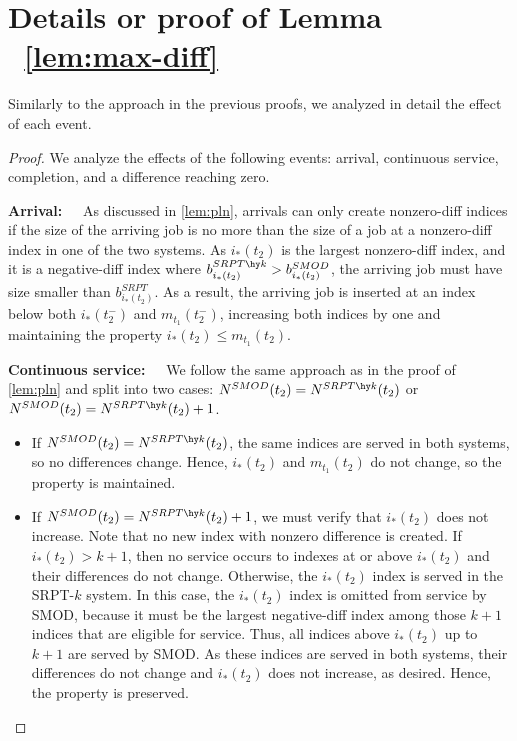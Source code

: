 \documentclass[acmsmall]{acmart}
\begin{document}
\section[Details of Proof of Lemma ~\ref{lem:max-diff}]{Details or proof of Lemma ~\ref{lem:max-diff}}
\label{ap:proof-max-diff}

Similarly to the approach in the previous proofs, we analyzed in detail the effect of each event.

\begin{proof}
We analyze the effects of the following events: arrival, continuous service, completion, and a difference reaching zero.

\textbf{Arrival:~~} As discussed in \cref{lem:pln}, arrivals can only create nonzero-diff indices if the size of the arriving job is no more than the size of a job at a nonzero-diff index in one of the two systems.
    As $i_*(t_2)$ is the largest nonzero-diff index, and it is a negative-diff index where $b^{SRPT\hy k}_{i_*(t_2)} > b^{SMOD}_{i_*(t_2)}$, the arriving job must have size smaller than
    $b^{SRPT}_{i_*(t_2)}$. As a result, the arriving job is inserted at an index below both $i_*(t_2^-)$ and $m_{t_1}(t_2^-)$, increasing both indices by one
    and maintaining the property $i_*(t_2) \le m_{t_1}(t_2)$.

    \textbf{Continuous service:~~} We follow the same approach as in the proof of \cref{lem:pln} and split into two cases: $N^{SMOD}(t_2) = N^{SRPT\hy k}(t_2)$ or $N^{SMOD}(t_2) = N^{SRPT\hy k}(t_2) + 1$.
    \begin{itemize}
        \item If $N^{SMOD}(t_2) = N^{SRPT\hy k}(t_2)$, the same indices are served in both systems, so no differences change. Hence, $i_*(t_2)$ and $m_{t_1}(t_2)$ do not change, so the property is maintained.

        \item If $N^{SMOD}(t_2) = N^{SRPT\hy k}(t_2) + 1$,
    we must verify that $i_*(t_2)$ does not increase. Note that no new index with nonzero difference is created.
    If $i_*(t_2)>k+1$, then no service occurs to indexes at or above $i_*(t_2)$ and their differences do not change. Otherwise, the $i_*(t_2)$ index is served in the SRPT-$k$ system.
    In this case, the $i_*(t_2)$ index is omitted from service by SMOD, because it must be the largest negative-diff index among those $k+1$ indices that are eligible for service.
    Thus, all indices above $i_*(t_2)$ up to $k+1$ are served by SMOD.
    As these indices are served in both systems, their differences do not change and $i_*(t_2)$ does not increase, as desired. Hence, the property is preserved.
    \end{itemize}


\end{proof}
\end{document}
